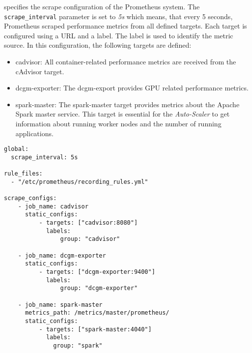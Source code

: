  specifies the scrape configuration of the Prometheus system.
The \texttt{scrape\_interval} parameter is set to \textit{5s} which means, that every 5 seconds, Prometheus scraped performance metrics from all defined targets.
Each target is configured using a URL and a label. The label is used to identify the metric source.
In this configuration, the following targets are defined:
\begin{itemize}
\item cadvisor: All container-related performance metrics are received from the cAdvisor target.

\item dcgm-exporter: The dcgm-export provides GPU related performance metrics.

\item spark-master: The spark-master target provides metrics about the Apache Spark master service. This target is essential for the \textit{Auto-Scaler} to get information about running worker nodes and the number of running applications.
\end{itemize}
\begin{lstlisting}[label=lst:06_computing_am_prom-config, caption=Prometheus target configuration in YAML syntax]
global:
  scrape_interval: 5s
 
rule_files:
  - "/etc/prometheus/recording_rules.yml"
 
scrape_configs:
    - job_name: cadvisor
      static_configs:
          - targets: ["cadvisor:8080"]
            labels:
                group: "cadvisor"
 
    - job_name: dcgm-exporter
      static_configs:
          - targets: ["dcgm-exporter:9400"]
            labels:
                group: "dcgm-exporter"
    
    - job_name: spark-master
      metrics_path: /metrics/master/prometheus/
      static_configs:
          - targets: ["spark-master:4040"]
            labels:
              group: "spark"
\end{lstlisting}


